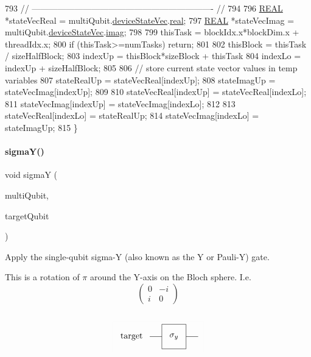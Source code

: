 \begin{DoxyCode}
793     \textcolor{comment}{// ---------------------------------------------------------------- //}
794 
796     \mbox{\hyperlink{QuEST__precision_8h_a4b654506f18b8bfd61ad2a29a7e38c25}{REAL}} *stateVecReal = multiQubit.\mbox{\hyperlink{structMultiQubit_a59ac613486a41b8c9a4b6e79cc8d2cc3}{deviceStateVec}}.\mbox{\hyperlink{structComplexArray_a4195cac6c784ea1b6271f1c7dba1548a}{real}};
797     \mbox{\hyperlink{QuEST__precision_8h_a4b654506f18b8bfd61ad2a29a7e38c25}{REAL}} *stateVecImag = multiQubit.\mbox{\hyperlink{structMultiQubit_a59ac613486a41b8c9a4b6e79cc8d2cc3}{deviceStateVec}}.\mbox{\hyperlink{structComplexArray_a79dde47c7ae530c79cebfdf57b225968}{imag}};
798 
799     thisTask = blockIdx.x*blockDim.x + threadIdx.x;
800     \textcolor{keywordflow}{if} (thisTask>=numTasks) \textcolor{keywordflow}{return};
801 
802     thisBlock   = thisTask / sizeHalfBlock;
803     indexUp     = thisBlock*sizeBlock + thisTask%
804     indexLo     = indexUp + sizeHalfBlock;
805 
806     \textcolor{comment}{// store current state vector values in temp variables}
807     stateRealUp = stateVecReal[indexUp];
808     stateImagUp = stateVecImag[indexUp];
809 
810     stateVecReal[indexUp] = stateVecReal[indexLo];
811     stateVecImag[indexUp] = stateVecImag[indexLo];
812 
813     stateVecReal[indexLo] = stateRealUp;
814     stateVecImag[indexLo] = stateImagUp;
815 \}
\end{DoxyCode}
\mbox{\label{QuEST__env__localGPU_8cu_a1f54d70a42403f7e1c2e2c2007332f61}} 
\paragraph{\texorpdfstring{sigma\+Y()}{sigmaY()}}
{\footnotesize\ttfamily void sigmaY (\begin{DoxyParamCaption}\item[{\mbox{\hyperlink{structMultiQubit}{Multi\+Qubit}}}]{multi\+Qubit,  }\item[{const int}]{target\+Qubit }\end{DoxyParamCaption})}



Apply the single-\/qubit sigma-\/Y (also known as the Y or Pauli-\/Y) gate. 

This is a rotation of $\pi$ around the Y-\/axis on the Bloch sphere. I.\+e. \[ \begin{pmatrix} 0 & -i \\ i & 0 \end{pmatrix} \] ~\newline
 \[ \setlength{\fboxrule}{0.01pt} \fbox{ \begin{tikzpicture}[scale=.5] \node[draw=none] at (-3.5, 0) {target}; \draw (-2,0) -- (-1, 0); \draw (1, 0) -- (2, 0); \draw (-1,-1)--(-1,1)--(1,1)--(1,-1)--cycle; \node[draw=none] at (0, 0) {$\sigma_y$}; \end{tikzpicture} } \] ~\newline
 
